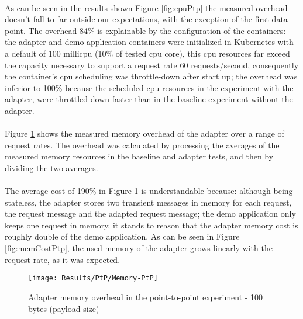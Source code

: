 \paragraph{}

As can be seen in the results shown Figure \ref{fig:cpuPtp} the measured overhead doesn't fall to far outside our expectations, with the exception of the first data point.
The overhead 84\% is explainable by the configuration of the containers:
the adapter and demo application containers were initialized in Kubernetes with a default of 100 millicpu (10\% of tested cpu core),
this cpu resources far exceed the capacity necessary to support a request rate 60 requests/second,
consequently the container's cpu scheduling was throttle-down after start up;
the overhead was inferior to 100\% because the scheduled cpu resources in the experiment with the adapter, were throttled down faster than in the baseline experiment without the adapter.

\paragraph{}

Figure \ref{fig:memPtp} shows the measured memory overhead of the adapter over a
range of request rates.
The overhead was calculated by processing the averages of the measured memory resources in the baseline and adapter tests, and then by dividing the two averages.

\paragraph{}

The average cost of 190\% in Figure \ref{fig:memPtp} is understandable because: although being stateless, the adapter stores two transient messages in memory for each request, the request message and the adapted request message;
the demo application only keeps one request in memory, it stands to reason that the adapter memory cost is roughly double of the demo application.
As can be seen in Figure \ref{fig:memCostPtp}, the used memory of the adapter grows linearly with the request rate, as it was expected.

\begin{figure}[htbp]
    \centering
    \texttt{[image: Results/PtP/Memory-PtP]}
    \caption{Adapter memory overhead in the point-to-point experiment - 100 bytes (payload size)}
    \label{fig:memPtp}
\end{figure}

